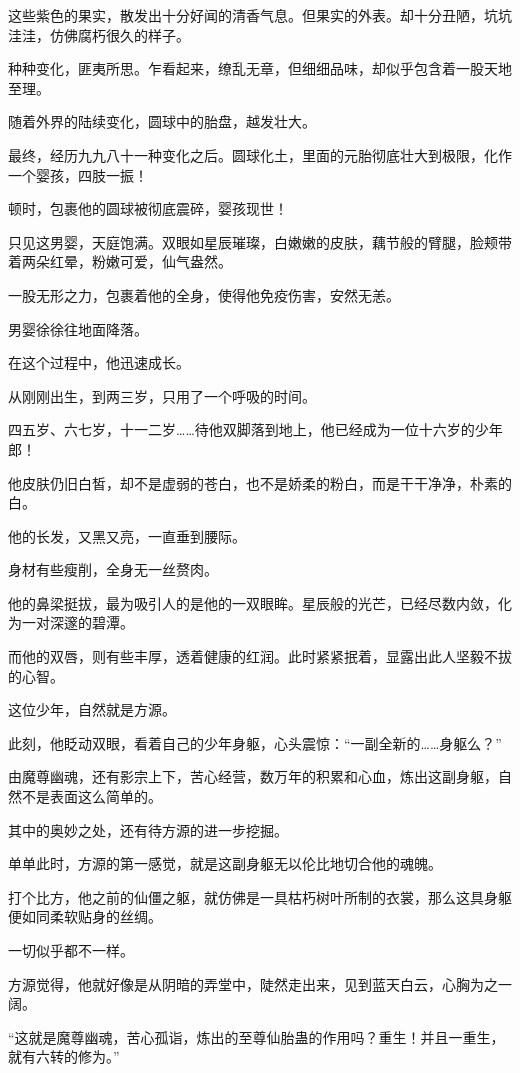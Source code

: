 \begin{this_body}
这些紫色的果实，散发出十分好闻的清香气息。但果实的外表。却十分丑陋，坑坑洼洼，仿佛腐朽很久的样子。

种种变化，匪夷所思。乍看起来，缭乱无章，但细细品味，却似乎包含着一股天地至理。

随着外界的陆续变化，圆球中的胎盘，越发壮大。

最终，经历九九八十一种变化之后。圆球化土，里面的元胎彻底壮大到极限，化作一个婴孩，四肢一振！

顿时，包裹他的圆球被彻底震碎，婴孩现世！

只见这男婴，天庭饱满。双眼如星辰璀璨，白嫩嫩的皮肤，藕节般的臂腿，脸颊带着两朵红晕，粉嫩可爱，仙气盎然。

一股无形之力，包裹着他的全身，使得他免疫伤害，安然无恙。

男婴徐徐往地面降落。

在这个过程中，他迅速成长。

从刚刚出生，到两三岁，只用了一个呼吸的时间。

四五岁、六七岁，十一二岁……待他双脚落到地上，他已经成为一位十六岁的少年郎！

他皮肤仍旧白皙，却不是虚弱的苍白，也不是娇柔的粉白，而是干干净净，朴素的白。

他的长发，又黑又亮，一直垂到腰际。

身材有些瘦削，全身无一丝赘肉。

他的鼻梁挺拔，最为吸引人的是他的一双眼眸。星辰般的光芒，已经尽数内敛，化为一对深邃的碧潭。

而他的双唇，则有些丰厚，透着健康的红润。此时紧紧抿着，显露出此人坚毅不拔的心智。

这位少年，自然就是方源。

此刻，他眨动双眼，看着自己的少年身躯，心头震惊：“一副全新的……身躯么？”

由魔尊幽魂，还有影宗上下，苦心经营，数万年的积累和心血，炼出这副身躯，自然不是表面这么简单的。

其中的奥妙之处，还有待方源的进一步挖掘。

单单此时，方源的第一感觉，就是这副身躯无以伦比地切合他的魂魄。

打个比方，他之前的仙僵之躯，就仿佛是一具枯朽树叶所制的衣裳，那么这具身躯便如同柔软贴身的丝绸。

一切似乎都不一样。

方源觉得，他就好像是从阴暗的弄堂中，陡然走出来，见到蓝天白云，心胸为之一阔。

“这就是魔尊幽魂，苦心孤诣，炼出的至尊仙胎蛊的作用吗？重生！并且一重生，就有六转的修为。”


\end{this_body}
